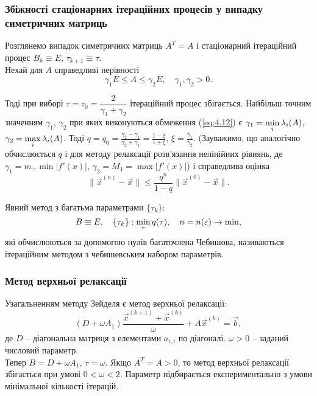 \subsubsection{Збіжності стаціонарних ітераційних процесів у випадку симетричних матриць}

Розглянемо випадок симетричних матриць $A^T=A$ і стаціонарний ітераційний процес $B_k \equiv E$, $\tau_{k+1} \equiv \tau$. \\

Нехай для $A$ справедливі нерівності
\begin{equation}
	\label{eq:4.12}
	\gamma_1 E \le A \le \gamma_2 E, \quad \gamma_1, \gamma_2 > 0.
\end{equation}

Тоді при виборі $\tau = \tau_0 = \dfrac{2}{\gamma_1 + \gamma_2}$ ітераційний процес збігається. Найбільш точним значенням $\gamma_1$, $\gamma_2$ при яких виконуються обмеження (\ref{eq:4.12}) є $\gamma_1 = \displaystyle\min\limits_i \lambda_i(A)$, $\gamma_2 = \displaystyle\max\limits_i \lambda_i(A)$. Тоді $q = q_0 = \frac{\gamma_2 - \gamma_1}{\gamma_2 + \gamma_1} = \frac{1-\xi}{1+\xi}$, $\xi = \frac{\gamma_1}{\gamma_2}$. (Зауважимо, що аналогічно обчислюється $q$ і для методу релаксації розв'язання нелінійних рівнянь, де $\gamma_1 = m_ = \min |f'(x)|$, $\gamma_2 = M_1 = \max|f'(x)|$) і справедлива оцінка\[ \|\vec x^{(n)} - \vec x\| \le \dfrac{q^n}{1-q} \|\vec x^{(0)} - \vec x\|. \]

Явний метод з багатьма параметрами $\{\tau_k\}$:
\[ B \equiv E, \quad \{\tau_k\}: \displaystyle\min\limits_\tau q(\tau), \quad n=n(\varepsilon)\to\min,\]
які обчислюються за допомогою нулів багаточлена Чебишова, називаються ітераційним методом з чебишевським набором параметрів.

\subsubsection{Метод верхньої релаксації}

Узагальненням методу Зейделя є метод верхньої релаксації: \[ (D + \omega A_1) \dfrac{\vec x^{(k+1)} + \vec x^{(k)}}{\omega} + A \vec x^{(k)} = \vec b,\]
де $D$ -- діагональна матриця з елементами $a_{i,i}$ по діагоналі. $\omega > 0$ -- заданий числовий параметр. \\

Тепер $B = D + \omega A_1$, $\tau = \omega$. Якщо $A^T = A > 0$, то метод верхньої релаксації збігається при умові $0 < \omega < 2$. Параметр підбирається експериментально з умови мінімальної кількості ітерацій. 


